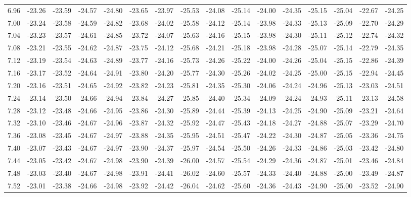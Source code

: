 \documentclass[floatfix,traditabstract,preprint2]{aa}
\begin{document}
\begin{table}
\begin{tabular}{c  c c c c c c c c c c c c c c c}
6.96 & -23.26 & -23.59 & -24.57 & -24.80 & -23.65 & -23.97 & -25.53 & -24.08 & -25.14 & -24.00 & -24.35 & -25.15 & -25.04 & -22.67 & -24.25\\
7.00 & -23.24 & -23.58 & -24.59 & -24.82 & -23.68 & -24.02 & -25.58 & -24.12 & -25.14 & -23.98 & -24.33 & -25.13 & -25.09 & -22.70 & -24.29\\
7.04 & -23.23 & -23.57 & -24.61 & -24.85 & -23.72 & -24.07 & -25.63 & -24.16 & -25.15 & -23.98 & -24.30 & -25.11 & -25.12 & -22.74 & -24.32\\
7.08 & -23.21 & -23.55 & -24.62 & -24.87 & -23.75 & -24.12 & -25.68 & -24.21 & -25.18 & -23.98 & -24.28 & -25.07 & -25.14 & -22.79 & -24.35\\
7.12 & -23.19 & -23.54 & -24.63 & -24.89 & -23.77 & -24.16 & -25.73 & -24.26 & -25.22 & -24.00 & -24.26 & -25.04 & -25.15 & -22.86 & -24.39\\
7.16 & -23.17 & -23.52 & -24.64 & -24.91 & -23.80 & -24.20 & -25.77 & -24.30 & -25.26 & -24.02 & -24.25 & -25.00 & -25.15 & -22.94 & -24.45\\
7.20 & -23.16 & -23.51 & -24.65 & -24.92 & -23.82 & -24.23 & -25.81 & -24.35 & -25.30 & -24.06 & -24.24 & -24.96 & -25.13 & -23.03 & -24.51\\
7.24 & -23.14 & -23.50 & -24.66 & -24.94 & -23.84 & -24.27 & -25.85 & -24.40 & -25.34 & -24.09 & -24.24 & -24.93 & -25.11 & -23.13 & -24.58\\
7.28 & -23.12 & -23.48 & -24.66 & -24.95 & -23.86 & -24.30 & -25.89 & -24.44 & -25.39 & -24.13 & -24.25 & -24.90 & -25.09 & -23.21 & -24.64\\
7.32 & -23.10 & -23.46 & -24.67 & -24.96 & -23.87 & -24.32 & -25.92 & -24.47 & -25.43 & -24.18 & -24.27 & -24.88 & -25.07 & -23.29 & -24.70\\
7.36 & -23.08 & -23.45 & -24.67 & -24.97 & -23.88 & -24.35 & -25.95 & -24.51 & -25.47 & -24.22 & -24.30 & -24.87 & -25.05 & -23.36 & -24.75\\
7.40 & -23.07 & -23.43 & -24.67 & -24.97 & -23.90 & -24.37 & -25.97 & -24.54 & -25.50 & -24.26 & -24.33 & -24.86 & -25.03 & -23.42 & -24.80\\
7.44 & -23.05 & -23.42 & -24.67 & -24.98 & -23.90 & -24.39 & -26.00 & -24.57 & -25.54 & -24.29 & -24.36 & -24.87 & -25.01 & -23.46 & -24.84\\
7.48 & -23.03 & -23.40 & -24.67 & -24.98 & -23.91 & -24.41 & -26.02 & -24.60 & -25.57 & -24.33 & -24.40 & -24.88 & -25.00 & -23.49 & -24.87\\
7.52 & -23.01 & -23.38 & -24.66 & -24.98 & -23.92 & -24.42 & -26.04 & -24.62 & -25.60 & -24.36 & -24.43 & -24.90 & -25.00 & -23.52 & -24.90\\

\end{tabular}
\end{table}
\end{document}

